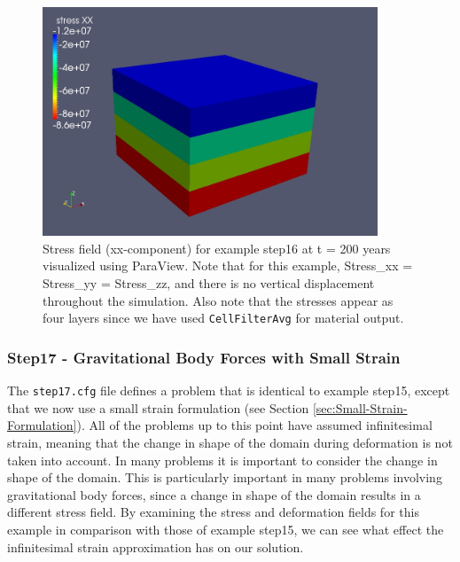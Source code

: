 \begin{figure}
\begin{centering}
\includegraphics[width=10cm]{tutorials/3dhex8/figs/step16-stress_xx-t200}
\par\end{centering}

\caption{Stress field (xx-component) for example step16 at t = 200 years visualized
using ParaView. Note that for this example, Stress\_xx = Stress\_yy
= Stress\_zz, and there is no vertical displacement throughout the
simulation. Also note that the stresses appear as four layers since
we have used \texttt{CellFilterAvg} for material output.\label{fig:step16-stress_xx-t200}}
\end{figure}



\subsubsection{Step17 - Gravitational Body Forces with Small Strain}

The \texttt{step17.cfg} file defines a problem that is identical to
example step15, except that we now use a small strain formulation
(see Section \vref{sec:Small-Strain-Formulation}). All of the problems
up to this point have assumed infinitesimal strain, meaning that the
change in shape of the domain during deformation is not taken into
account. In many problems it is important to consider the change in
shape of the domain. This is particularly important in many problems
involving gravitational body forces, since a change in shape of the
domain results in a different stress field. By examining the stress
and deformation fields for this example in comparison with those of
example step15, we can see what effect the infinitesimal strain approximation
has on our solution.

